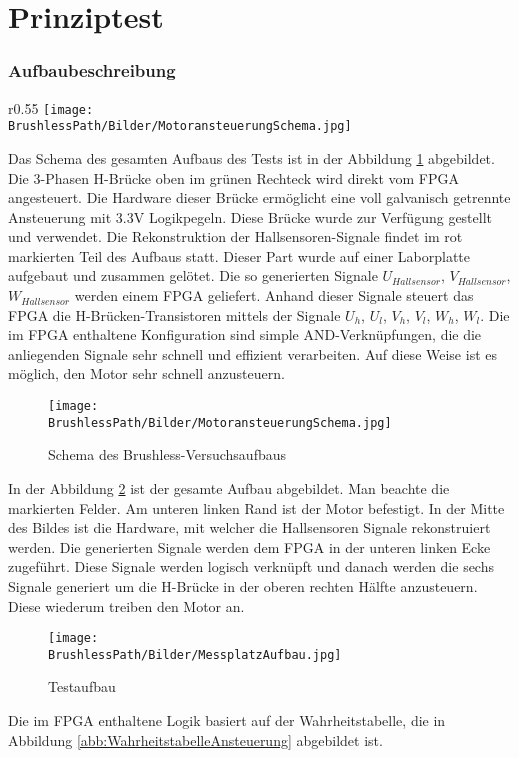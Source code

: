 \ifSTANDALONE
\section{Prinziptest}
\fi
\ifEMBED
\subsubsection{Aufbaubeschreibung}
    \BLDCcollab
\fi
\ifEMBED
    \begin{wrapfigure}{r}{0.55\textwidth}
       	\texttt{[image: \\BrushlessPath/Bilder/MotoransteuerungSchema.jpg]}
       	\centering
       	\caption{Schema des Brushless-Versuchsaufbaus}
        \label{abb:MotoransteuerungSchema}
    \end{wrapfigure}
\fi
    Das Schema des gesamten Aufbaus des Tests ist in der Abbildung 
    \ref{abb:MotoransteuerungSchema} abgebildet. Die 3-Phasen H-Brücke 
    oben im grünen Rechteck wird direkt vom FPGA angesteuert. Die Hardware 
    dieser Brücke ermöglicht eine voll galvanisch getrennte Ansteuerung 
    mit 3.3V Logikpegeln. Diese Brücke wurde zur Verfügung gestellt und 
    verwendet. Die Rekonstruktion der Hallsensoren-Signale findet im rot 
    markierten Teil des Aufbaus statt. Dieser Part wurde auf einer 
    Laborplatte aufgebaut und zusammen gelötet. Die so generierten Signale 
    $U_{Hallsensor}$, $V_{Hallsensor}$, $W_{Hallsensor}$ werden einem FPGA 
    geliefert. Anhand dieser Signale steuert das FPGA die 
    H-Brücken-Transistoren mittels der Signale $U_h$, $U_l$, $V_h$, $V_l$, 
    $W_h$, $W_l$. Die im FPGA enthaltene Konfiguration sind simple 
    AND-Verknüpfungen, die die anliegenden Signale sehr schnell und 
    effizient verarbeiten. Auf diese Weise ist es möglich, den Motor sehr 
    schnell anzusteuern.
    \ifSTANDALONE
    \begin{figure}[h!]
    	\texttt{[image: \\BrushlessPath/Bilder/MotoransteuerungSchema.jpg]}
       	\centering
       	\caption{Schema des Brushless-Versuchsaufbaus}
        \label{abb:MotoransteuerungSchema}
    \end{figure}
    \fi
    In der Abbildung \ref{abb:MessplatzAufbau} ist der gesamte Aufbau 
    abgebildet. Man beachte die markierten Felder. Am unteren linken Rand 
    ist der Motor befestigt. In der Mitte des Bildes ist die Hardware, mit 
    welcher die Hallsensoren Signale rekonstruiert werden. Die generierten 
    Signale werden dem FPGA in der unteren linken Ecke zugeführt. Diese 
    Signale werden logisch verknüpft und danach werden die sechs Signale 
    generiert um die H-Brücke in der oberen rechten Hälfte anzusteuern. 
    Diese wiederum treiben den Motor an.
    \begin{figure}[h!]
       	\texttt{[image: \\BrushlessPath/Bilder/MessplatzAufbau.jpg]}
       	\centering
       	\caption{Testaufbau} 
        \label{abb:MessplatzAufbau}
    \end{figure}
    Die im FPGA enthaltene Logik basiert auf der Wahrheitstabelle, die in 
    Abbildung \ref{abb:WahrheitstabelleAnsteuerung} abgebildet ist.


